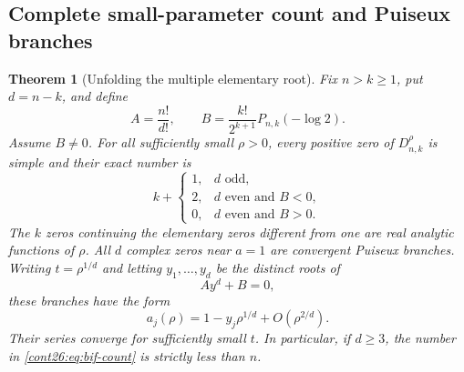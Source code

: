 \documentclass[11pt,letterpaper]{article}
\numberwithin{equation}{section}
\theoremstyle{plain}
\newtheorem{theorem}{Theorem}[section]
\theoremstyle{definition}
\theoremstyle{remark}
\begin{document}
\subsection{Complete small-parameter count and Puiseux branches}

\begin{theorem}[Unfolding the multiple elementary root]
\label{cont26:thm:bif-small-rho}
Fix $n>k\geq1$, put $d=n-k$, and define
\begin{equation}\label{cont26:eq:bif-constants}
 A=\frac{n!}{d!},\qquad
 B=\frac{k!}{2^{k+1}}P_{n,k}(-\log2).
\end{equation}
Assume $B\ne0$. For all sufficiently small $\rho>0$, every positive
zero of $D_{n,k}^{\rho}$ is simple and their exact number is
\begin{equation}\label{cont26:eq:bif-count}
 k+\begin{cases}
 1,&d\text{ odd},\\
 2,&d\text{ even and }B<0,\\
 0,&d\text{ even and }B>0.
 \end{cases}
\end{equation}
The $k$ zeros continuing the elementary zeros different from one are
real analytic functions of $\rho$. All $d$ complex zeros near $a=1$
are convergent Puiseux branches. Writing $t=\rho^{1/d}$ and letting
$y_1,\ldots,y_d$ be the distinct roots of
\begin{equation}\label{cont26:eq:bif-leading-equation}
 A y^d+B=0,
\end{equation}
these branches have the form
\begin{equation}\label{cont26:eq:bif-puiseux}
 a_j(\rho)=1-y_j\rho^{1/d}+O(\rho^{2/d}).
\end{equation}
Their series converge for sufficiently small $t$. In particular,
if $d\geq3$, the number in \eqref{cont26:eq:bif-count} is strictly less than $n$.
\end{theorem}
\end{document}
